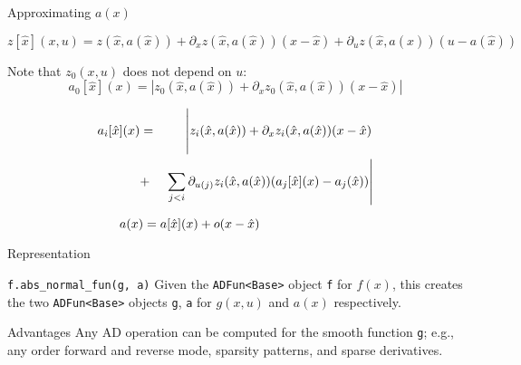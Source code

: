 \documentclass{beamer}
\begin{document}
\begin{frame}{Approximating $a(x)$}

\[
z[ \hat{x} ]( x , u )
=
z ( \hat{x}, a( \hat{x} ) )
	+ \partial_x z ( \hat{x}, a( \hat{x} ) ) ( x - \hat{x} )
	+ \partial_u z ( \hat{x}, a( \hat{x} ) ) ( u - a( \hat{x} ) )
\]
\pause

Note that $z_0 ( x , u )$ does not depend on $u$:
\[
a_0 [ \hat{x} ]( x )
=
\left|
	z_0 ( \hat{x}, a( \hat{x} ) )
	+ \partial_x z_0 ( \hat{x}, a( \hat{x} ) ) ( x - \hat{x} )
\right|
\]
\pause

\begin{eqnarray*}
a_i [ \hat{x} ]( x )
& = &
\left | \vphantom{ \sum_{j < i} } z_i ( \hat{x}, a( \hat{x} ) )
	+ \partial_x z_i ( \hat{x}, a( \hat{x} ) ) ( x - \hat{x} )
\right.
\\
& + &
\left. \sum_{j < i} \partial_{u(j)} z_i ( \hat{x}, a( \hat{x} ) )
			( a_j [ \hat{x} ] ( x )  - a_j ( \hat{x} ) )
\right|
\end{eqnarray*}
\pause

\[
a(x) = a[ \hat{x} ]( x ) + o( x - \hat{x} )
\phantom{\rule{1in}{1pt}}
\]


\end{frame}
\begin{frame}{Representation}

\begin{block}{ \texttt{f.abs\_normal\_fun(g, a)} }
Given the \texttt{ADFun<Base>} object \texttt{f} for $f(x)$,
this creates the two \texttt{ADFun<Base>} objects \texttt{g}, \texttt{a}
for $g(x, u)$ and $a(x)$ respectively.
\end{block}
\pause

\begin{block}{Advantages}
Any AD operation can be computed for the smooth function \texttt{g}; e.g.,
any order forward and reverse mode, sparsity patterns, and sparse derivatives.
\end{block}

\end{frame}
\end{document}
